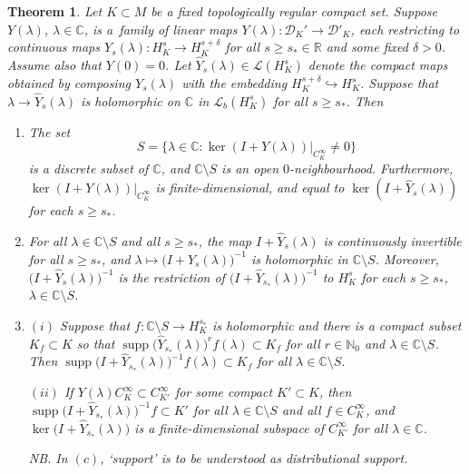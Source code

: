 \documentclass[11pt]{article}
\numberwithin{equation}{section}
\numberwithin{equation}{section}
\newtheorem{Theorem}{Theorem}[section]
\newcommand{\CC}{{\mathbb C}}
\newcommand{\RR}{{\mathbb R}}
\newcommand{\NN}{{\mathbb N}}
\newcommand{\DD}{{\mathscr D}}
\newcommand{\LL}{{\mathcal L}}
\DeclareMathOperator{\supp}{supp}
\begin{document}
 \begin{Theorem}\label{thm:Sobolevinversion}
 	Let $K\subset M$ be a fixed topologically regular compact set. Suppose
 	$Y(\lambda)$, $\lambda\in\CC$, is a~family of linear maps
 	$Y(\lambda)\colon\DD_K'\to\DD'_K$, each restricting to continuous maps $Y_s(\lambda)\colon H^s_K\to H^{s+\delta}_K$ for all $s\ge s_*\in\RR$ and some fixed $\delta>0$. Assume also that $Y(0)=0$.
 	Let $\hat{Y}_s(\lambda)\in\LL(H^s_K)$ denote the compact maps obtained by composing $Y_s(\lambda)$ with the embedding $H^{s+\delta}_K\hookrightarrow H^s_K$. Suppose that $\lambda \to \hat{Y}_s(\lambda)$ is holomorphic on $\CC$ in $\LL_b(H^s_K)$ for all $s\ge s_*$. Then
 	\begin{enumerate}\itemsep=0pt
 		\item[$(a)$] The set
 		\begin{equation}\label{eq:Sdef}
 			S=\big\{\lambda\in\CC\colon \ker (I+ Y(\lambda))|_{C^\infty_K}\neq 0\big\}
 		\end{equation}
 		is a discrete subset of $\CC$, and $\CC\setminus S$ is an open $0$-neighbourhood. Furthermore, $\ker (I+ Y(\lambda))|_{C^\infty_K}$ is finite-dimensional, and equal to
 		$\ker (I+ \hat{Y}_s(\lambda))$ for each $s\ge s_*$.
 		
 		\item[$(b)$] For all $\lambda\in \CC\setminus S$ and all $s\ge s_*$, the map $I+ \hat{Y}_{s}(\lambda)$ is continuously invertible for all $s\ge s_*$, and $\lambda\mapsto \big(I+ \hat{Y}_{s}(\lambda)\big)^{-1}$ is holomorphic in $\CC\setminus S$. Moreover,
 		$\big(I+ \hat{Y}_{s}(\lambda)\big)^{-1}$ is the restriction of $\big(I+ \hat{Y}_{s_*}(\lambda)\big)^{-1}$ to $H^s_K$ for each $s\ge s_*$, $\lambda\in\CC\setminus S$.
 		
 		\item[$(c)$] $(i)$ Suppose that $f\colon \CC\setminus S\to H^{s_*}_K$ is holomorphic and
 		there is a compact subset ${K_f\subset K}$ so that $\supp \big(\hat{Y}_{s_*}(\lambda)\big)^r f(\lambda)\subset K_f$ for all $r\in\NN_0$ and $\lambda\in \CC\setminus S$. Then $\supp \big(I+\hat{Y}_{s_*}(\lambda)\big)^{-1}f(\lambda)\subset K_f$ for all $\lambda\in \CC\setminus S$.
 		
 		$(ii)$ If $Y(\lambda)C^\infty_K\subset C^\infty_{K'}$ for some compact $K'\subset K$, then
 		$\supp \big(I+ \hat{Y}_{s_*}(\lambda)\big)^{-1}f\subset K'$ for all $\lambda\in \CC\setminus S$ and all $f\in C^\infty_K$, and
 		$\ker \big(I+ \hat{Y}_{s_*}(\lambda)\big)$ is a finite-dimensional subspace of
 		$C^\infty_{K'}$ for all $\lambda\in\CC$.
 		
 		NB. In $(c)$, `support' is to be understood as distributional support.
 	\end{enumerate}
 \end{Theorem}
\end{document}
